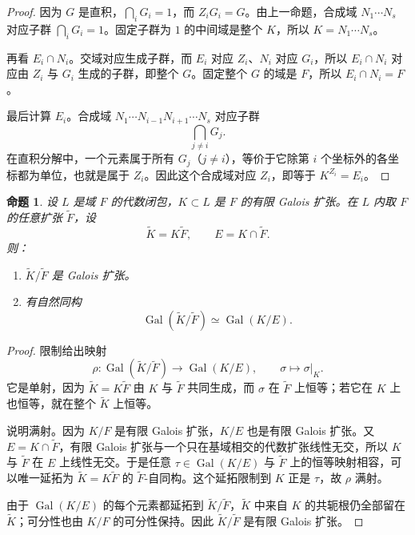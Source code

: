 \documentclass[11pt,a4paper,openany]{ctexbook}
\numberwithin{equation}{chapter}
\newcommand{\Gal}{\operatorname{Gal}}
\theoremstyle{plain}
\newtheorem{proposition}[theorem]{命题}
\theoremstyle{definition}
\theoremstyle{remark}
\begin{document}
\begin{proof}
因为 $G$ 是直积，$\bigcap_i G_i=1$，而 $Z_iG_i=G$。由上一命题，合成域 $N_1\cdots N_s$ 对应子群 $\bigcap_iG_i=1$。固定子群为 $1$ 的中间域是整个 $K$，所以 $K=N_1\cdots N_s$。

再看 $E_i\cap N_i$。交域对应生成子群，而 $E_i$ 对应 $Z_i$、$N_i$ 对应 $G_i$，所以 $E_i\cap N_i$ 对应由 $Z_i$ 与 $G_i$ 生成的子群，即整个 $G$。固定整个 $G$ 的域是 $F$，所以 $E_i\cap N_i=F$。

最后计算 $E_i$。合成域 $N_1\cdots N_{i-1}N_{i+1}\cdots N_s$ 对应子群
\[
\bigcap_{j\ne i}G_j.
\]
在直积分解中，一个元素属于所有 $G_j$（$j\ne i$），等价于它除第 $i$ 个坐标外的各坐标都为单位，也就是属于 $Z_i$。因此这个合成域对应 $Z_i$，即等于 $K^{Z_i}=E_i$。
\end{proof}

\begin{proposition}
设 $L$ 是域 $F$ 的代数闭包，$K\subset L$ 是 $F$ 的有限 Galois 扩张。在 $L$ 内取 $F$ 的任意扩张 $\widetilde F$，设
\[
\widetilde K=K\widetilde F,\qquad E=K\cap \widetilde F.
\]
则：
\begin{enumerate}[label=(\arabic*)]
\item $\widetilde K/\widetilde F$ 是 Galois 扩张。
\item 有自然同构
\[
\Gal(\widetilde K/\widetilde F)\simeq \Gal(K/E).
\]
\end{enumerate}
\end{proposition}

\begin{proof}
限制给出映射
\[
\rho:\Gal(\widetilde K/\widetilde F)\longrightarrow \Gal(K/E),\qquad
\sigma\longmapsto \sigma|_K.
\]
它是单射，因为 $\widetilde K=K\widetilde F$ 由 $K$ 与 $\widetilde F$ 共同生成，而 $\sigma$ 在 $\widetilde F$ 上恒等；若它在 $K$ 上也恒等，就在整个 $\widetilde K$ 上恒等。

说明满射。因为 $K/F$ 是有限 Galois 扩张，$K/E$ 也是有限 Galois 扩张。又 $E=K\cap\widetilde F$，有限 Galois 扩张与一个只在基域相交的代数扩张线性无交，所以 $K$ 与 $\widetilde F$ 在 $E$ 上线性无交。于是任意 $\tau\in\Gal(K/E)$ 与 $\widetilde F$ 上的恒等映射相容，可以唯一延拓为 $\widetilde K=K\widetilde F$ 的 $\widetilde F$-自同构。这个延拓限制到 $K$ 正是 $\tau$，故 $\rho$ 满射。

由于 $\Gal(K/E)$ 的每个元素都延拓到 $\widetilde K/\widetilde F$，$\widetilde K$ 中来自 $K$ 的共轭根仍全部留在 $\widetilde K$；可分性也由 $K/F$ 的可分性保持。因此 $\widetilde K/\widetilde F$ 是有限 Galois 扩张。
\end{proof}
\end{document}
